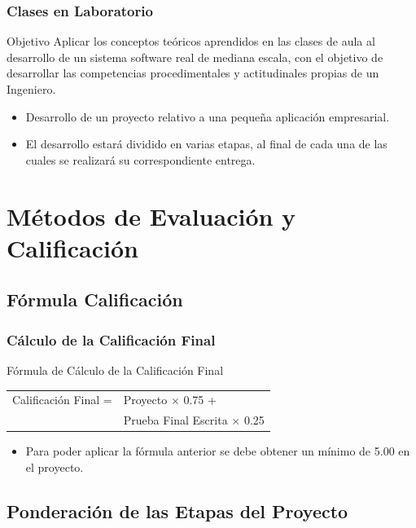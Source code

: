 \documentclass[handout,a4paper,t,xcolor=pst,dvips,colortheme]{beamer}
\begin{document}
\begin{frame}
	\frametitle{Clases en Laboratorio}
	\begin{block}{Objetivo}
        Aplicar los conceptos teóricos aprendidos en las clases de aula al desarrollo de un sistema software real de mediana escala, con el objetivo de desarrollar las competencias procedimentales y actitudinales propias de un Ingeniero.
	\end{block}
	\begin{itemize}
        \item<2-> Desarrollo de un proyecto relativo a una pequeña aplicación empresarial.
        \item<3-> El desarrollo estará dividido en varias etapas, al final de cada una de las cuales se realizará su correspondiente entrega.
	\end{itemize}
\end{frame}

\section{Métodos de Evaluación y Calificación}

\subsection{Fórmula Calificación}

\begin{frame}[c]
	\frametitle{Cálculo de la Calificación Final}
	\begin{block}{Fórmula de Cálculo de la Calificación Final}
		\begin{center}
        \begin{tabular}{ll}
			Calificación  Final  =  & Proyecto $\times$ 0.75 + \\
                                    & Prueba  Final  Escrita $\times$ 0.25 \\
		\end{tabular}
        \end{center}
	\end{block}
	\begin{itemize}
		\item<2-> Para poder aplicar la fórmula anterior se debe obtener un mínimo de 5.00 en el proyecto.
	\end{itemize}
\end{frame}

\subsection{Ponderación de las Etapas del Proyecto}
\end{document}
